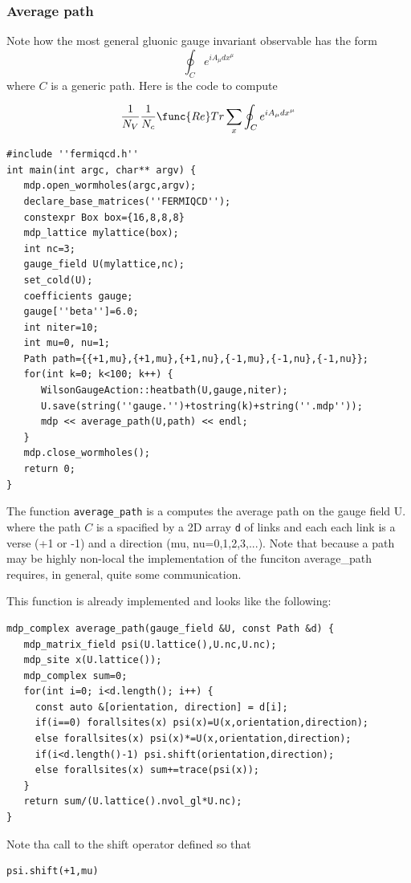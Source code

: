 \subsubsection{Average path}

Note how the most general gluonic gauge invariant observable has the form 
\[
\oint_Ce^{iA_\mu dx^\mu } 
\]
where $C$ is a generic path. Here is the code to compute

\[
\frac 1{N_V}\frac 1{N_c}\func{Re}Tr\sum_x\oint_Ce^{iA_\mu dx^\mu } 
\]
\begin{verbatim}
#include ''fermiqcd.h''
int main(int argc, char** argv) {
   mdp.open_wormholes(argc,argv);
   declare_base_matrices(''FERMIQCD'');
   constexpr Box box={16,8,8,8}
   mdp_lattice mylattice(box);
   int nc=3;
   gauge_field U(mylattice,nc);
   set_cold(U);
   coefficients gauge;
   gauge[''beta'']=6.0;
   int niter=10;
   int mu=0, nu=1;
   Path path={{+1,mu},{+1,mu},{+1,nu},{-1,mu},{-1,nu},{-1,nu}};
   for(int k=0; k<100; k++) {
      WilsonGaugeAction::heatbath(U,gauge,niter);
      U.save(string(''gauge.'')+tostring(k)+string(''.mdp''));
      mdp << average_path(U,path) << endl;
   }
   mdp.close_wormholes();
   return 0;
}
\end{verbatim}

The function {\tt average\_path} is a computes the average path on the gauge
field U. where the path $C$ is a spacified by a 2D array {\tt d} of links
and each each link is a verse (+1 or -1) and a direction (mu,
nu=0,1,2,3,...). Note that because a path may be highly non-local the
implementation of the funciton average\_path requires, in general, quite
some communication.

This function is already implemented and looks like the following:
\begin{verbatim}
mdp_complex average_path(gauge_field &U, const Path &d) {
   mdp_matrix_field psi(U.lattice(),U.nc,U.nc);
   mdp_site x(U.lattice());
   mdp_complex sum=0;
   for(int i=0; i<d.length(); i++) {
     const auto &[orientation, direction] = d[i];
     if(i==0) forallsites(x) psi(x)=U(x,orientation,direction);
     else forallsites(x) psi(x)*=U(x,orientation,direction);
     if(i<d.length()-1) psi.shift(orientation,direction);
     else forallsites(x) sum+=trace(psi(x));
   }
   return sum/(U.lattice().nvol_gl*U.nc);
}
\end{verbatim}

Note tha call to the shift operator defined so that
\begin{verbatim}
psi.shift(+1,mu)
\end{verbatim}

